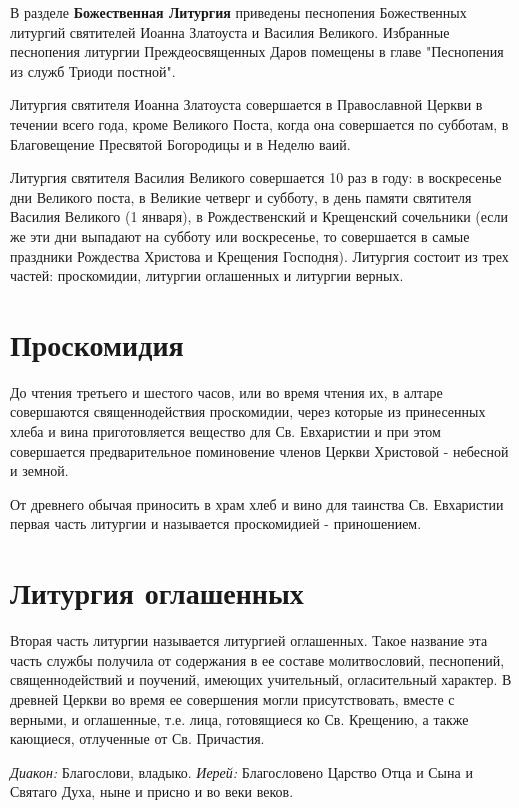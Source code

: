 

В разделе {\bfseries  Божественная Литургия} приведены песнопения Божественных литургий святителей Иоанна Златоуста и Василия Великого. Избранные песнопения литургии Преждеосвященных Даров помещены в главе "Песнопения из служб Триоди постной".

Литургия святителя Иоанна Златоуста совершается в Православной Церкви в течении всего года, кроме Великого Поста, когда она совершается по субботам, в Благовещение Пресвятой Богородицы и в Неделю ваий.

Литургия святителя Василия Великого совершается 10 раз в году: в воскресенье дни Великого поста, в Великие четверг и субботу, в день памяти святителя Василия Великого (1 января), в Рождественский и Крещенский сочельники (если же эти дни выпадают на субботу или воскресенье, то совершается в самые праздники Рождества Христова и Крещения Господня).
Литургия состоит из трех частей: проскомидии, литургии оглашенных и литургии верных.
 

\chapter{Проскомидия}
 
До чтения третьего и шестого часов, или во время чтения их, в алтаре совершаются священнодействия проскомидии, через которые из принесенных хлеба и вина приготовляется вещество для Св. Евхаристии и при этом совершается предварительное поминовение членов Церкви Христовой - небесной и земной.

От древнего обычая приносить в храм хлеб и вино для таинства Св. Евхаристии первая часть литургии и называется проскомидией - приношением.


\chapter{Литургия оглашенных}
 
Вторая часть литургии называется литургией оглашенных. Такое название эта часть службы получила от содержания в ее составе молитвословий, песнопений, священнодействий и поучений, имеющих учительный, огласительный характер. В древней Церкви во время ее совершения могли присутствовать, вместе с верными, и оглашенные, т.е. лица, готовящиеся ко Св. Крещению, а также кающиеся, отлученные от Св. Причастия.

{\itshape Диакон:} Благослови, владыко.
{\itshape Иерей:} Благословено Царство Отца и Сына и Святаго Духа, ныне и присно и во веки веков. 


